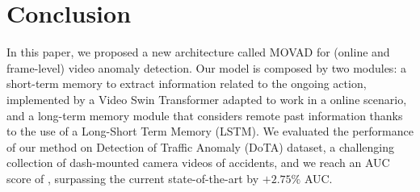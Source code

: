 \section{Conclusion}
\label{sec:conclusions}

In this paper, we proposed a new architecture called MOVAD for (online and frame-level) video anomaly detection.
Our model is composed by two modules: a short-term memory to extract information related to the ongoing action, implemented by a Video Swin Transformer adapted to work in a online scenario, and a long-term memory module that considers remote past information thanks to the use of a Long-Short Term Memory (LSTM).
We evaluated the performance of our method on Detection of Traffic Anomaly (DoTA) dataset, a challenging collection of dash-mounted camera videos of accidents, and we reach an AUC score of , surpassing the current state-of-the-art by $+2.75\%$ AUC.